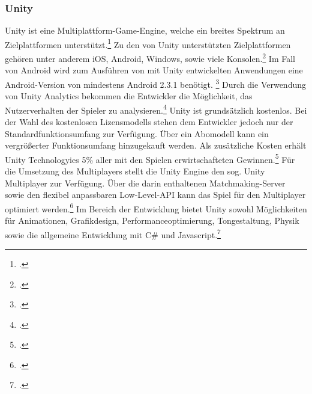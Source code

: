 	\subsubsection*{Unity}
	Unity ist eine Multiplattform-Game-Engine, welche ein breites Spektrum an Zielplattformen unterstützt.\footcite[\url{https://unity3d.com/de/unity}]{unity-home} Zu den von Unity unterstützten Zielplattformen gehören unter anderem iOS, Android, Windows, sowie viele Konsolen.\footcite[\url{https://unity3d.com/de/unity/multiplatform}]{unity-home} Im Fall von Android wird zum Ausführen von mit Unity entwickelten Anwendungen eine Android-Version von mindestens Android 2.3.1 benötigt. \footcite[\url{https://unity3d.com/de/unity/system-requirements}]{unity-home} Durch die Verwendung von Unity Analytics bekommen die Entwickler die Möglichkeit, das Nutzerverhalten der Spieler zu analysieren.\footcite[\url{https://unity3d.com/de/services/analytics}]{unity-home} Unity ist grundsätzlich kostenlos. Bei der Wahl des kostenlosen Lizensmodells stehen dem Entwickler jedoch nur der Standardfunktionsumfang zur Verfügung. Über ein Abomodell kann ein vergrößerter Funktionsumfang hinzugekauft werden. Als zusätzliche Kosten erhält Unity Technologyies 5\% aller mit den Spielen erwirtschafteten Gewinnen.\footcite[\url{https://store.unity.com/de}]{unity-home}
	Für die Umsetzung des Multiplayers stellt die Unity Engine den sog. Unity Multiplayer zur Verfügung. Über die darin enthaltenen Matchmaking-Server sowie den flexibel anpassbaren Low-Level-API kann das Spiel für den Multiplayer optimiert werden.\footcite[\url{https://unity3d.com/de/services/multiplayer}]{unity-home}
	Im Bereich der Entwicklung bietet Unity sowohl Möglichkeiten für Animationen, Grafikdesign, Performanceoptimierung, Tongestaltung, Physik sowie die allgemeine Entwicklung mit C\# und Javascript.\footcite[\url{https://unity3d.com/de/unity/editor}]{unity-home}

